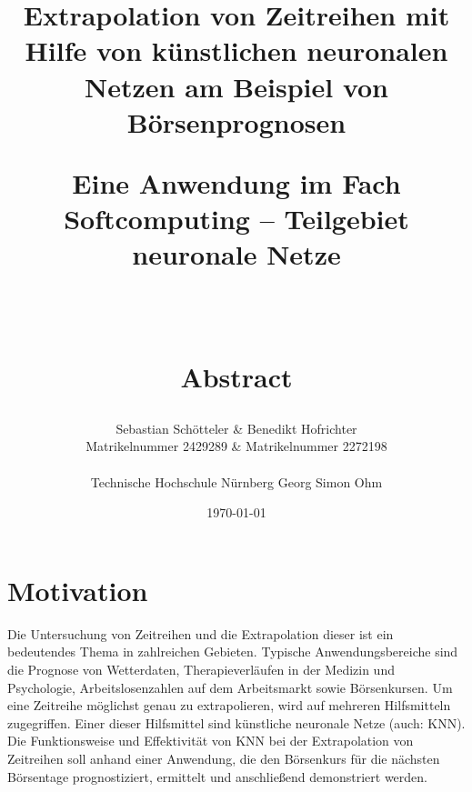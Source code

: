 \documentclass[11pt,a4paper]{article}
\begin{document}
\title{{\bf Extrapolation von Zeitreihen mit Hilfe von künstlichen neuronalen Netzen am Beispiel von Börsenprognosen} \\
\begin{large}Eine Anwendung im Fach Softcomputing – Teilgebiet neuronale Netze\end{large}\\
\begin{large}Abstract\end{large}}
\author
{
	Sebastian Schötteler \& Benedikt Hofrichter \\
	Matrikelnummer 2429289 \& Matrikelnummer 2272198 \\\\ 
	Technische Hochschule Nürnberg Georg Simon Ohm \\
}
\date{\today}
\maketitle

\tableofcontents

\section{Motivation}
Die Untersuchung von Zeitreihen und die Extrapolation dieser ist ein bedeutendes Thema in zahlreichen Gebieten. Typische Anwendungsbereiche sind die Prognose von Wetterdaten, Therapieverläufen in der Medizin und Psychologie, Arbeitslosenzahlen auf dem Arbeitsmarkt sowie Börsenkursen. Um eine Zeitreihe möglichst genau zu extrapolieren, wird auf mehreren Hilfsmitteln zugegriffen. Einer dieser Hilfsmittel sind künstliche neuronale Netze (auch: KNN).
Die Funktionsweise und Effektivität von KNN bei der Extrapolation von Zeitreihen soll anhand einer Anwendung, die den Börsenkurs für die nächsten Börsentage prognostiziert, ermittelt und anschließend demonstriert werden.
\end{document}
